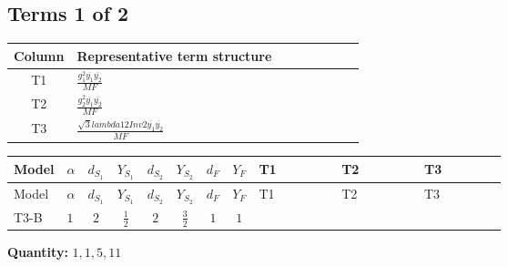 \documentclass[8pt]{article}
\begin{document}
\begin{landscape}
\subsection*{Terms 1 of 2}
\begin{center}
\begin{tabular}{@{}c >{\raggedright\arraybackslash}p{0.82\linewidth}@{}}
\toprule
Column & Representative term structure \\
\midrule
T1 & \(\displaystyle \frac{g_{1}^{2} \overline{y_{1}} \overline{y_{2}}}{MF}\) \\
\midrule
T2 & \(\displaystyle \frac{g_{2}^{2} \overline{y_{1}} \overline{y_{2}}}{MF}\) \\
\midrule
T3 & \(\displaystyle \frac{\sqrt{3} lambda12Inv2 \overline{y_{1}} \overline{y_{2}}}{MF}\) \\
\midrule
\bottomrule
\end{tabular}
\end{center}
\smallskip
\tiny
\begin{longtable}{@{}llcccccc >{\raggedright\arraybackslash}p{0.21\linewidth} >{\raggedright\arraybackslash}p{0.21\linewidth} >{\raggedright\arraybackslash}p{0.21\linewidth}@{}}
\toprule
Model & $\alpha$ & $d_{S_1}$ & $Y_{S_1}$ & $d_{S_2}$ & $Y_{S_2}$ & $d_F$ & $Y_F$ & T1 & T2 & T3 \\
\midrule
\endfirsthead
\toprule
Model & $\alpha$ & $d_{S_1}$ & $Y_{S_1}$ & $d_{S_2}$ & $Y_{S_2}$ & $d_F$ & $Y_F$ & T1 & T2 & T3 \\
\midrule
\endhead
T3-B & $1$ & $2$ & $\frac{1}{2}$ & $2$ & $\frac{3}{2}$ & $1$ & $1$ & \scriptsize\adjustbox{max width=\linewidth}{$\begin{gathered} - \frac{3 g_{1}^{2} \overline{y_{1}} \overline{y_{2}}}{2 MF}\end{gathered}$} & \scriptsize\adjustbox{max width=\linewidth}{$\begin{gathered} - \frac{3 g_{2}^{2} \overline{y_{1}} \overline{y_{2}}}{4 MF}\end{gathered}$} & \scriptsize\adjustbox{max width=\linewidth}{$\begin{gathered} - \frac{\sqrt{3} lambda12Inv2 \overline{y_{1}} \overline{y_{2}}}{3 MF}\end{gathered}$} \\
\midrule
\bottomrule
\end{longtable}
\clearpage
\noindent\textbf{Quantity: }$\mathrm{1,1,5,11}$\par\smallskip

\end{landscape}
\end{document}
